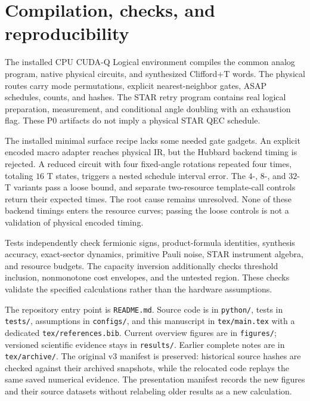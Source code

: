 \documentclass[11pt]{article}
\begin{document}
\section{Compilation, checks, and reproducibility}
The installed CPU CUDA-Q Logical environment compiles the common analog
program, native physical circuits, and synthesized Clifford+T words.
The physical routes carry mode permutations, explicit nearest-neighbor gates,
ASAP schedules, counts, and hashes. The STAR retry program contains real
logical preparation, measurement, and conditional angle doubling with an
exhaustion flag. These P0 artifacts do not imply a physical STAR QEC schedule.

The installed minimal surface recipe lacks some needed gate gadgets.
An explicit encoded macro adapter reaches physical IR, but the Hubbard
backend timing is rejected. A reduced circuit with four fixed-angle
rotations repeated four times, totaling $16$ T states, triggers a nested
schedule interval error. The $4$-, $8$-, and $32$-T variants pass a loose
bound, and separate two-resource template-call controls return their
expected times. The root cause remains unresolved. None of these backend
timings enters the resource curves; passing the loose controls is not a
validation of physical encoded timing.

Tests independently check fermionic signs, product-formula identities,
synthesis accuracy, exact-sector dynamics, primitive Pauli noise, STAR
instrument algebra, and resource budgets. The capacity inversion additionally
checks threshold inclusion, nonmonotone cost envelopes, and the untested
region. These checks validate the specified calculations rather than the
hardware assumptions.

The repository entry point is \texttt{README.md}. Source code is in
\texttt{python/}, tests in \texttt{tests/}, assumptions in \texttt{configs/},
and this manuscript in \texttt{tex/main.tex} with a dedicated
\texttt{tex/references.bib}. Current overview figures are in \texttt{figures/};
versioned scientific evidence stays in \texttt{results/}. Earlier complete
notes are in \texttt{tex/archive/}. The original v3 manifest is preserved:
historical source hashes are checked against their archived snapshots, while
the relocated code replays the same saved numerical evidence. The presentation
manifest records the new figures and their source datasets without relabeling
older results as a new calculation.



\end{document}
